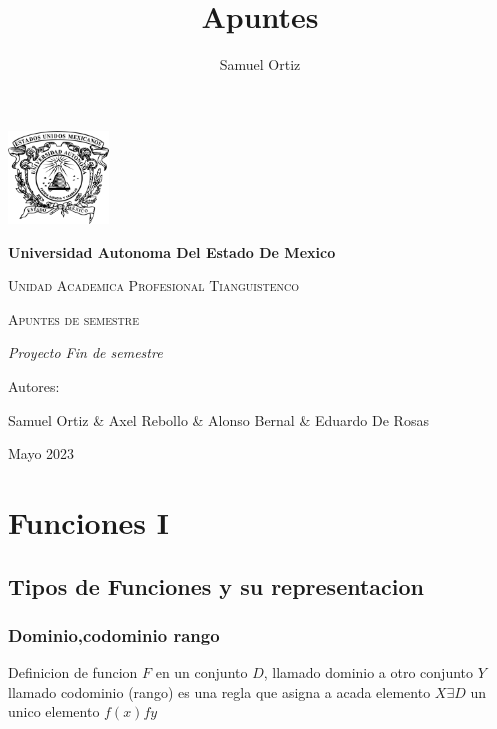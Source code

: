 \documentclass[english,10pt,a4paper]{article}
\title{Apuntes }
\author{Samuel Ortiz}
\begin{document}
	\begin{titlepage}
		\centering
		{\includegraphics[width=0.2\textwidth]{logo}\par}
		\vspace{1cm}
		{\bfseries\LARGE Universidad Autonoma Del Estado De Mexico\par}
		\vspace{1cm}
		{\scshape\Large Unidad Academica Profesional Tianguistenco \par}
		\vspace{3cm}
		{\scshape\Huge Apuntes de semestre\par}
		\vspace{3cm}
		{\itshape\Large Proyecto Fin de semestre \par}
		\vfill
		{\Large Autores: \par}
		{\Large Samuel Ortiz \& Axel Rebollo \& Alonso Bernal \& Eduardo De Rosas\par}
		\vfill
		{\Large Mayo 2023 \par}
		\end{titlepage}
		\newpage
		
		
	\begin{titlepage}
		\centering 
				\tableofcontents

\end{titlepage}
\newpage
\section{Funciones I}
	\subsection{Tipos de Funciones y su representacion}
		\subsubsection{Dominio,codominio rango}
			Definicion de funcion $F$ en un conjunto $D$, llamado dominio a otro conjunto $Y$ llamado codominio (rango) es una regla que asigna a acada elemento  $X \exists D$ un unico elemento $f(x)  fy$
			 \vspace{0.3cm} \\
			 
\end{document}
